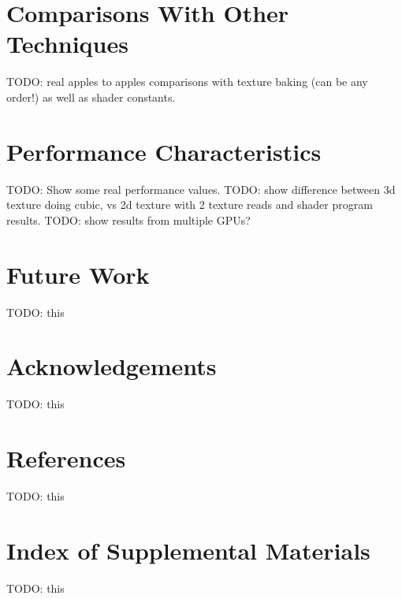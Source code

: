 \documentclass{jcgt}
\begin{document}
\section{Comparisons With Other Techniques}
\label{sec:comparisonswithothertechniques}

TODO: real apples to apples comparisons with texture baking (can be any order!) as well as shader constants.

\section{Performance Characteristics}
\label{sec:performancecharacteristics}

TODO: Show some real performance values. 
TODO: show difference between 3d texture doing cubic, vs 2d texture with 2 texture reads and shader program results.
TODO: show results from multiple GPUs?

\section*{Future Work}
\label{sec:futurework}

TODO: this

\section*{Acknowledgements}
\label{sec:acknowledgements}
TODO: this


\section*{References}
\label{sec:references}
TODO: this


\section*{Index of Supplemental Materials}
\label{sec:indexofsupplementalmaterials}
TODO: this


\end{document}

